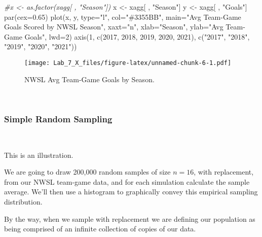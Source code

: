 \documentclass[
]{article}
\newenvironment{Shaded}{\begin{snugshade}}{\end{snugshade}}
\newcommand{\AttributeTok}[1]{\textcolor[rgb]{0.77,0.63,0.00}{#1}}
\newcommand{\CommentTok}[1]{\textcolor[rgb]{0.56,0.35,0.01}{\textit{#1}}}
\newcommand{\DecValTok}[1]{\textcolor[rgb]{0.00,0.00,0.81}{#1}}
\newcommand{\FloatTok}[1]{\textcolor[rgb]{0.00,0.00,0.81}{#1}}
\newcommand{\FunctionTok}[1]{\textcolor[rgb]{0.00,0.00,0.00}{#1}}
\newcommand{\NormalTok}[1]{#1}
\newcommand{\OtherTok}[1]{\textcolor[rgb]{0.56,0.35,0.01}{#1}}
\newcommand{\StringTok}[1]{\textcolor[rgb]{0.31,0.60,0.02}{#1}}
\begin{document}
\begin{Shaded}
\begin{Highlighting}[]
\CommentTok{\#x \textless{}{-} as.factor(xagg[ , "Season"])}
\NormalTok{x }\OtherTok{\textless{}{-}}\NormalTok{ xagg[ , }\StringTok{"Season"}\NormalTok{]}
\NormalTok{y }\OtherTok{\textless{}{-}}\NormalTok{ xagg[ , }\StringTok{"Goals"}\NormalTok{]}
\FunctionTok{par}\NormalTok{(}\AttributeTok{cex=}\FloatTok{0.65}\NormalTok{)}
\FunctionTok{plot}\NormalTok{(x, y, }\AttributeTok{type=}\StringTok{"l"}\NormalTok{, }\AttributeTok{col=}\StringTok{"\#3355BB"}\NormalTok{, }\AttributeTok{main=}\StringTok{"Avg Team{-}Game Goals Scored by NWSL Season"}\NormalTok{, }
     \AttributeTok{xaxt=}\StringTok{"n"}\NormalTok{, }\AttributeTok{xlab=}\StringTok{"Season"}\NormalTok{, }\AttributeTok{ylab=}\StringTok{"Avg Team{-}Game Goals"}\NormalTok{, }\AttributeTok{lwd=}\DecValTok{2}\NormalTok{)}
\FunctionTok{axis}\NormalTok{(}\DecValTok{1}\NormalTok{, }\FunctionTok{c}\NormalTok{(}\DecValTok{2017}\NormalTok{, }\DecValTok{2018}\NormalTok{, }\DecValTok{2019}\NormalTok{, }\DecValTok{2020}\NormalTok{, }\DecValTok{2021}\NormalTok{), }\FunctionTok{c}\NormalTok{(}\StringTok{"2017"}\NormalTok{, }\StringTok{"2018"}\NormalTok{, }\StringTok{"2019"}\NormalTok{, }\StringTok{"2020"}\NormalTok{, }\StringTok{"2021"}\NormalTok{))}
\end{Highlighting}
\end{Shaded}

\begin{figure}
\centering
\texttt{[image: Lab\_7\_X\_files/figure-latex/unnamed-chunk-6-1.pdf]}
\caption{NWSL Avg Team-Game Goals by Season.}
\end{figure}

~~

\hypertarget{simple-random-sampling}{%
\subsubsection{Simple Random Sampling}\label{simple-random-sampling}}

~~

This is an illustration.

We are going to draw 200,000 random samples of size \(n=16\), with
replacement, from our NWSL team-game data, and for each simulation
calculate the sample average. We'll then use a histogram to graphically
convey this empirical sampling distribution.

By the way, when we sample with replacement we are defining our
population as being comprised of an infinite collection of copies of our
data.
\end{document}
